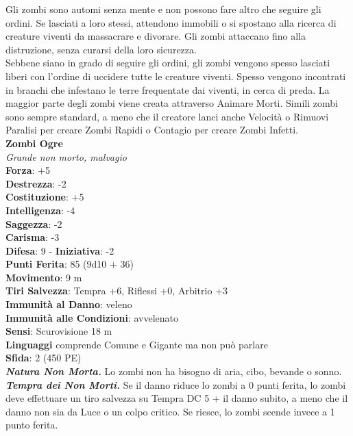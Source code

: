 \begin{multicols}{2}
Gli zombi sono automi senza mente e non possono fare altro che seguire gli ordini. Se lasciati a loro stessi, attendono immobili o si spostano alla ricerca di creature viventi da massacrare e divorare. Gli zombi attaccano fino alla distruzione, senza curarsi della loro sicurezza.\\

Sebbene siano in grado di seguire gli ordini, gli zombi vengono spesso lasciati liberi con l'ordine di uccidere tutte le creature viventi. Spesso vengono incontrati in branchi che infestano le terre frequentate dai viventi, in cerca di preda. La maggior parte degli zombi viene creata attraverso Animare Morti. Simili zombi sono sempre standard, a meno che il creatore lanci anche Velocità o Rimuovi Paralisi per creare Zombi Rapidi o Contagio per creare Zombi Infetti.\\

\medskip\textbf{Zombi Ogre}\\
\emph{Grande non morto, malvagio}\\
\textbf{Forza}: +5\\
\textbf{Destrezza}: -2\\
\textbf{Costituzione}: +5\\
\textbf{Intelligenza}: -4\\
\textbf{Saggezza}: -2\\
\textbf{Carisma}: -3\\
\textbf{Difesa}: 9 - \textbf{Iniziativa}: -2\\
\textbf{Punti Ferita}: 85 (9d10 + 36)\\
\textbf{Movimento}: 9 m\\
\textbf{Tiri Salvezza}: Tempra +6, Riflessi +0, Arbitrio +3\\
\textbf{Immunità al Danno}: veleno\\
\textbf{Immunità alle Condizioni}: avvelenato\\
\textbf{Sensi}: Scurovisione 18 m\\
\textbf{Linguaggi} comprende Comune e Gigante ma non può parlare\\
\textbf{Sfida}: 2 (450 PE)\smallskip\\
\emph{\textbf{Natura Non Morta.}} Lo zombi non ha bisogno di aria, cibo, bevande o sonno.\\
\emph{\textbf{Tempra dei Non Morti.}} Se il danno riduce lo zombi a 0 punti ferita, lo zombi deve effettuare un tiro salvezza su Tempra DC 5 + il danno subito, a meno che il danno non sia da Luce o un colpo critico. Se riesce, lo zombi scende invece a 1 punto ferita.\\


\end{multicols}
